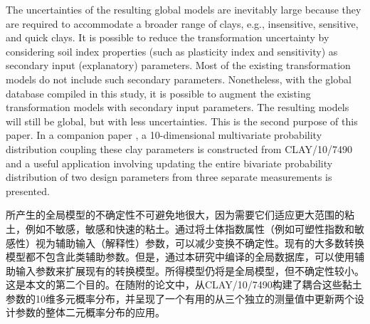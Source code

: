 \begin{paracol}{2}
    
    \switchcolumn*

    The uncertainties of the resulting global models are inevitably large because they are required to accommodate a broader range of clays, e.g., insensitive, sensitive, and quick clays. It is possible to reduce the transformation uncertainty by considering soil index properties (such as plasticity index and sensitivity) as secondary input (explanatory) parameters. Most of the existing transformation models do not include such secondary parameters. Nonetheless, with the global database compiled in this study, it is possible to augment the existing transformation models with secondary input parameters. The resulting models will still be global, but with less uncertainties. This is the second purpose of this paper. In a companion paper \citep{Ching2014686}, a 10-dimensional multivariate probability distribution coupling these clay parameters is constructed from CLAY/10/7490 and a useful application involving updating the entire bivariate probability distribution of two design parameters from three separate measurements is presented.
    
    \switchcolumn
    
    所产生的全局模型的不确定性不可避免地很大，因为需要它们适应更大范围的粘土，例如不敏感，敏感和快速的粘土。通过将土体指数属性（例如可塑性指数和敏感性）视为辅助输入（解释性）参数，可以减少变换不确定性。现有的大多数转换模型都不包含此类辅助参数。但是，通过本研究中编译的全局数据库，可以使用辅助输入参数来扩展现有的转换模型。所得模型仍将是全局模型，但不确定性较小。这是本文的第二个目的。在随附的论文中\citep{Ching2014686}，从CLAY/10/7490构建了耦合这些黏土参数的10维多元概率分布，并呈现了一个有用的从三个独立的测量值中更新两个设计参数的整体二元概率分布的应用。

\end{paracol}